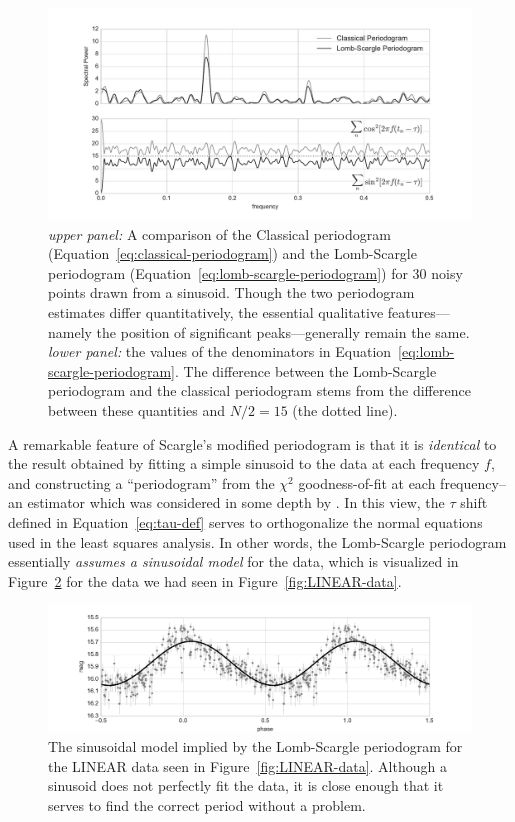 \documentclass[preprint]{aastex}
\newcommand{\fig}[1]{Figure~\ref{fig:#1}}
\newcommand{\figlabel}[1]{\label{fig:#1}}
\newcommand{\Eq}[1]{Equation~\ref{eq:#1}}
\newcommand{\eq}[1]{\Eq{#1}}
\begin{document}
\begin{figure}[ht]
  \centering
  \includegraphics[width=\textwidth]{fig17_ls_comparison}
  \caption{{\it upper panel:} A comparison of the Classical periodogram
    (\eq{classical-periodogram}) and the Lomb-Scargle periodogram
    (\eq{lomb-scargle-periodogram}) for 30 noisy points drawn from a sinusoid.
    Though the two periodogram estimates differ quantitatively, the essential
    qualitative features---namely the position of significant peaks---generally
    remain the same.
    {\it lower panel:} the values of the denominators in
    \eq{lomb-scargle-periodogram}.
    The difference between the Lomb-Scargle periodogram and the classical
    periodogram stems from the difference between these quantities
    and $N/2 = 15$ (the dotted line).
    \figlabel{ls-comparison}}
\end{figure}

A remarkable feature of Scargle's modified periodogram is that it is
{\it identical} to the result
obtained by fitting a simple sinusoid to the data at each frequency $f$, and
constructing a ``periodogram'' from the $\chi^2$ goodness-of-fit at each
frequency--an estimator which was considered in some depth by \citet{Lomb76}.
In this view, the $\tau$ shift defined in \eq{tau-def} serves to orthogonalize
the normal equations used in the least squares analysis.
In other words, the Lomb-Scargle periodogram essentially {\it assumes a
sinusoidal model} for the data, which is visualized in \fig{ls-model} for
the data we had seen in \fig{LINEAR-data}.

\begin{figure}[ht]
  \centering
  \includegraphics[width=\textwidth]{fig18_ls_model}
  \caption{The sinusoidal model implied by the Lomb-Scargle periodogram for
    the LINEAR data seen in \fig{LINEAR-data}.
    Although a sinusoid does not perfectly fit the data, it is close enough
    that it serves to find the correct period without a problem.
    \figlabel{ls-model}}
\end{figure}
\end{document}
